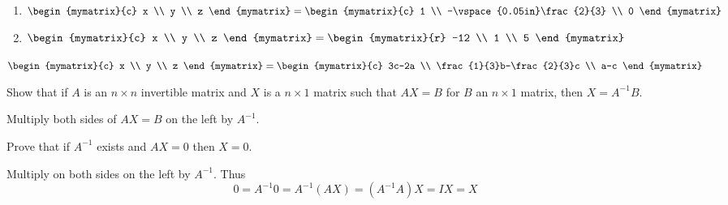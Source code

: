 \begin{enumialphparenastyle}
\begin{ex}
\begin{sol}
\begin{enumerate}
\item $\begin{mymatrix}{c}
x \\
y \\
z
\end{mymatrix} =\begin{mymatrix}{c}
1 \\
-\vspace{0.05in}\frac{2}{3} \\
0
\end{mymatrix}$
\item $\begin{mymatrix}{c}
x \\
y \\
z
\end{mymatrix} = \begin{mymatrix}{r}
-12 \\
1 \\
5
\end{mymatrix}$
\end{enumerate}

$\begin{mymatrix}{c}
x \\
y \\
z
\end{mymatrix} = 
\begin{mymatrix}{c}
3c-2a \\
\frac{1}{3}b-\frac{2}{3}c \\
a-c
\end{mymatrix}$
\end{sol}
\end{ex}

\begin{ex}Show that if $A$ is an $n\times n$ invertible matrix and $X$
is a $n\times 1$ matrix such that $AX=B$ for $B$ an 
$n\times 1$ matrix, then $X=A^{-1}B$. 
\begin{sol}
Multiply both sides of $AX=B$ on the left by $A^{-1}$.
\end{sol}
\end{ex}

\begin{ex}Prove that if $A^{-1}$ exists and $AX=0$ then $X=0$. 
\begin{sol}
Multiply on both sides on the left by $A^{-1}.$ Thus
\[
0=A^{-1}0=A^{-1}\left( AX\right) =\left(
A^{-1}A\right) X=IX = X
\]
\end{sol}
\end{ex}


\end{enumialphparenastyle}
